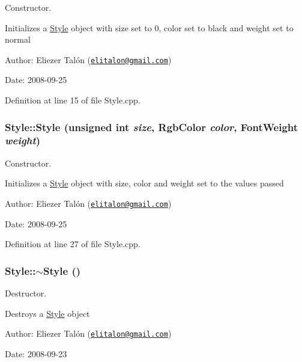 Constructor. 

Initializes a \hyperlink{class_style}{Style} object with size set to 0, color set to black and weight set to normal

\begin{Desc}
\item[Author:]Eliezer Talón (\href{mailto:elitalon@gmail.com}{\tt elitalon@gmail.com}) \end{Desc}
\begin{Desc}
\item[Date:]2008-09-25 \end{Desc}


Definition at line 15 of file Style.cpp.\hypertarget{class_style_69801b8ce2b1520ef24e1a84d04609e5}{
\subsubsection[Style]{\setlength{\rightskip}{0pt plus 5cm}Style::Style (unsigned int {\em size}, \/  {\bf RgbColor} {\em color}, \/  {\bf FontWeight} {\em weight})}}
\label{class_style_69801b8ce2b1520ef24e1a84d04609e5}


Constructor. 

Initializes a \hyperlink{class_style}{Style} object with size, color and weight set to the values passed

\begin{Desc}
\item[Author:]Eliezer Talón (\href{mailto:elitalon@gmail.com}{\tt elitalon@gmail.com}) \end{Desc}
\begin{Desc}
\item[Date:]2008-09-25 \end{Desc}


Definition at line 27 of file Style.cpp.\hypertarget{class_style_7c798ef9b77bc94719542feade497725}{
\subsubsection[$\sim$Style]{\setlength{\rightskip}{0pt plus 5cm}Style::$\sim$Style ()}}
\label{class_style_7c798ef9b77bc94719542feade497725}


Destructor. 

Destroys a \hyperlink{class_style}{Style} object

\begin{Desc}
\item[Author:]Eliezer Talón (\href{mailto:elitalon@gmail.com}{\tt elitalon@gmail.com}) \end{Desc}
\begin{Desc}
\item[Date:]2008-09-23 \end{Desc}


